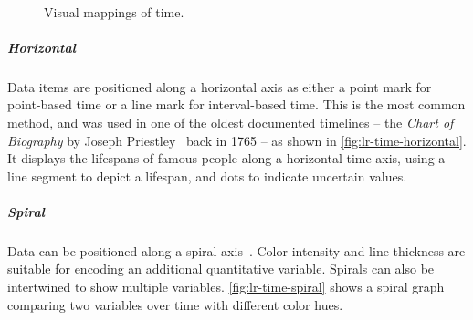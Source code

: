 \begin{figure}
	\\ \vspace{.5\baselineskip}
	\caption{Visual mappings of time.}
	\label{fig:lr-time}
\end{figure}

\subparagraph{Horizontal} Data items are positioned along a horizontal axis as either a point mark for point-based time or a line mark for interval-based time. This is the most common method, and was used in one of the oldest documented timelines -- the \emph{Chart of Biography} by Joseph Priestley~\cite{Priestley1765} back in 1765 -- as shown in \autoref{fig:lr-time-horizontal}. It displays the lifespans of famous people along a horizontal time axis, using a line segment to depict a lifespan, and dots to indicate uncertain values.

\subparagraph{Spiral} Data can be positioned along a spiral axis~\cite{Weber2001}. Color intensity and line thickness are suitable for encoding an additional quantitative variable. Spirals can also be intertwined to show multiple variables. \autoref{fig:lr-time-spiral} shows a spiral graph comparing two variables over time with different color hues.

